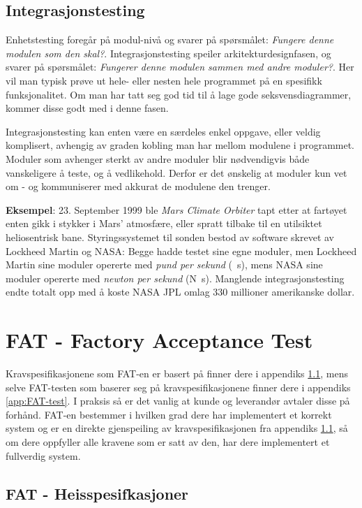 \subsection{Integrasjonstesting}

Enhetstesting foregår på modul-nivå og svarer på spørsmålet: \textit{Fungere denne modulen som den skal?}. Integrasjonstesting speiler arkitekturdesignfasen, og svarer på spørsmålet: \textit{Fungerer denne modulen sammen med andre moduler?}. Her vil man typisk prøve ut hele- eller nesten hele programmet på en spesifikk funksjonalitet. Om man har tatt seg god tid til å lage gode seksvensdiagrammer, kommer disse godt med i denne fasen.

Integrasjonstesting kan enten være en særdeles enkel oppgave, eller veldig komplisert, avhengig av graden kobling man har mellom modulene i programmet. Moduler som avhenger sterkt av andre moduler blir nødvendigvis både vanskeligere å teste, og å vedlikehold. Derfor er det ønskelig at moduler kun vet om - og kommuniserer med akkurat de modulene den trenger.

\textbf{Eksempel}: 23. September 1999 ble \textit{Mars Climate Orbiter} tapt etter at fartøyet enten gikk i stykker i Mars' atmosfære, eller spratt tilbake til en utilsiktet heliosentrisk bane. Styringssystemet til sonden bestod av software skrevet av Lockheed Martin og NASA: Begge hadde testet sine egne moduler, men Lockheed Martin sine moduler opererte med \textit{pund per sekund} (\si{\pound\s}), mens NASA sine moduler opererte med \textit{newton per sekund} (\si{\N\s}). Manglende integrasjonstesting endte totalt opp med å koste NASA JPL omlag 330 millioner amerikanske dollar.


\section{FAT - Factory Acceptance Test}\label{subsec:FAT}

Kravspesifikasjonene som FAT-en er basert på finner dere i appendiks \ref{app:FATkrav}, mens selve FAT-testen som baserer seg på kravspesifikasjonene finner dere i appendiks \ref{app:FAT-test}. I praksis så er det vanlig at kunde og leverandør avtaler disse på forhånd. FAT-en bestemmer i hvilken grad dere har implementert et korrekt system og er en direkte gjenspeiling av kravspesifikasjonen fra appendiks \ref{app:FATkrav}, så om dere oppfyller alle kravene som er satt av den, har dere implementert et fullverdig system.


\subsection{FAT - Heisspesifkasjoner}\label{app:FATkrav}


